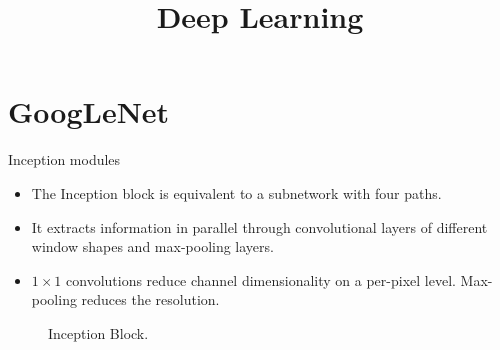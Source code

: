 





\newcommand{\titlefigure}{plots/moderncnn/residual-block.png}
\newcommand{\learninggoals}{
  \item GoogleNet
  \item ResNet
  \item DenseNet
  \item U-Net
}

\title{Deep Learning}
\date{}







\section{GoogLeNet}


\begin{vbframe}{Inception modules}
    \begin{itemize}
        \item The Inception block is equivalent to a subnetwork with four paths. 
        \item It extracts information in parallel through convolutional layers of different window shapes and max-pooling layers.  
        \item $1 \times 1$ convolutions reduce channel dimensionality on a per-pixel level. Max-pooling reduces the resolution.
    \end{itemize}
  \begin{figure}
    \centering
    \caption{Inception Block.}
  \end{figure}
        \end{vbframe}


